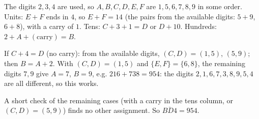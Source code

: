 The digits $2,3,4$ are used, so $A,B,C,D,E,F$ are $1,5,6,7,8,9$ in some order. Units: $E+F$ ends in $4$, so $E+F=14$ (the pairs from the available digits: $5+9$, $6+8$), with a carry of $1$. Tens: $C+3+1=D$ or $D+10$. Hundreds: $2+A+(\text{carry})=B$.

If $C+4=D$ (no carry): from the available digits, $(C,D)=(1,5)$, $(5,9)$; then $B=A+2$. With $(C,D)=(1,5)$ and $\{E,F\}=\{6,8\}$, the remaining digits $7,9$ give $A=7$, $B=9$, e.g. $216+738=954$: the digits $2,1,6,7,3,8,9,5,4$ are all different, so this works.

A short check of the remaining cases (with a carry in the tens column, or $(C,D)=(5,9)$) finds no other assignment. So $\overline{BD4}=\boxed{954}$.
